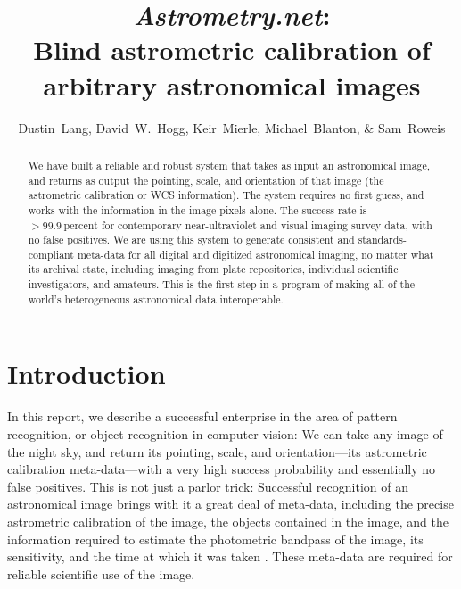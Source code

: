 \documentclass[12pt,preprint]{aastex}
\newcommand{\unit}[1]{\mathrm{#1}}
\newcommand{\percent}{\unit{percent}}
\renewcommand{\%}{\percent}
\begin{document}
\title{\textsl{Astrometry.net}: \\
       Blind astrometric calibration of arbitrary astronomical images}
\author{Dustin~Lang,
        David~W.~Hogg,
        Keir~Mierle,
        Michael~Blanton, \&
        Sam~Roweis
}

\begin{abstract}
We have built a reliable and robust system that takes as input an
astronomical image, and returns as output the pointing, scale, and
orientation of that image (the astrometric calibration or WCS
information).  The system requires no first guess, and works with the
information in the image pixels alone.  The success rate is
$>99.9~\percent$ for contemporary near-ultraviolet and visual imaging
survey data, with no false positives.  We are using this system to
generate consistent and standards-compliant meta-data for all digital
and digitized astronomical imaging, no matter what its archival state,
including imaging from plate repositories, individual scientific
investigators, and amateurs.  This is the first step in a program of
making all of the world's heterogeneous astronomical data
interoperable.
\end{abstract}

\section{Introduction}

In this report, we describe a successful enterprise in the area of
pattern recognition, or object recognition in computer vision: We can
take any image of the night sky, and return its pointing, scale, and
orientation---its astrometric calibration meta-data---with a very high
success probability and essentially no false positives.  This is not
just a parlor trick: Successful recognition of an astronomical image
brings with it a great deal of meta-data, including the precise
astrometric calibration of the image, the objects contained in the
image, and the information required to estimate the photometric
bandpass of the image, its sensitivity, and the time at which it was
taken \cite{barron08b}.  These meta-data are required for reliable
scientific use of the image.
\end{document}
